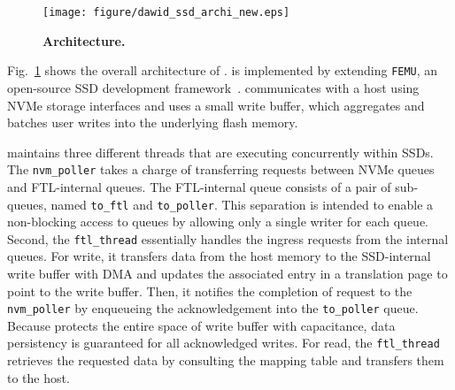 \begin{figure}[t!]
    \centering{}
    \texttt{[image: figure/dawid\_ssd\_archi\_new.eps]}
    \caption{\textbf{\ours{} Architecture.}}
    \label{fig_dawid_archi}
    \vspace{-20pt}
\end{figure}

Fig.~\ref{fig_dawid_archi} shows the overall
architecture of \ours{}. %
\ours{} is implemented by extending \texttt{FEMU}, an open-source SSD development
framework~\cite{li2018case}. 
\ours{} communicates with a host using NVMe storage interfaces and uses a small write buffer, which aggregates and batches user writes into the underlying flash memory.  


\ours{} maintains three different threads that are executing concurrently
within SSDs.  The \texttt{nvm\_poller} takes a charge of transferring requests
between NVMe queues and FTL-internal queues. The FTL-internal queue consists of
a pair of sub-queues, named \texttt{to\_ftl} and
\texttt{to\_poller}. This separation is intended to enable a non-blocking
access to queues by allowing only a single writer for each queue.  Second, the
\texttt{ftl\_thread} essentially handles the ingress requests from the internal
queues. For write, it transfers data from the host memory to the SSD-internal
write buffer with DMA and updates the associated entry in a translation page to
point to the write buffer. Then, it notifies the completion of request to the
\texttt{nvm\_poller} by enqueueing the acknowledgement into the
\texttt{to\_poller} queue.  Because \ours{} protects the entire space of write
buffer with capacitance, data persistency is guaranteed for all acknowledged
writes.  For read, the \texttt{ftl\_thread} retrieves the requested data by
consulting the mapping table and transfers them to the host. 

